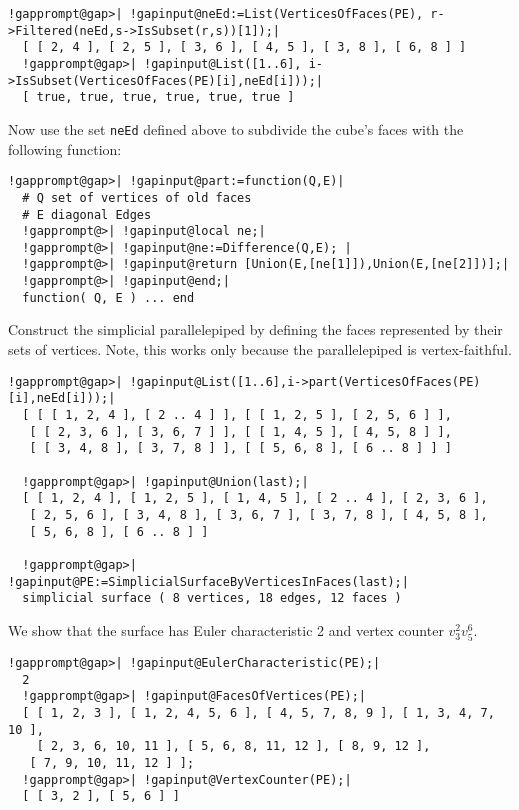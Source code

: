 \documentclass[a4paper,11pt]{report}
\begin{document}
{{{\begin{Verbatim}[commandchars=!@|,fontsize=\small,frame=single,label=Example]
  !gapprompt@gap>| !gapinput@neEd:=List(VerticesOfFaces(PE), r->Filtered(neEd,s->IsSubset(r,s))[1]);|
  [ [ 2, 4 ], [ 2, 5 ], [ 3, 6 ], [ 4, 5 ], [ 3, 8 ], [ 6, 8 ] ]
  !gapprompt@gap>| !gapinput@List([1..6], i->IsSubset(VerticesOfFaces(PE)[i],neEd[i]));|
  [ true, true, true, true, true, true ]
\end{Verbatim}
 

 
\begin{center}

\end{center}
 Now use the set \texttt{neEd} defined above to subdivide the cube's faces with the following function: 

 
\begin{Verbatim}[commandchars=!@|,fontsize=\small,frame=single,label=Example]
  !gapprompt@gap>| !gapinput@part:=function(Q,E)|
  # Q set of vertices of old faces 
  # E diagonal Edges
  !gapprompt@>| !gapinput@local ne;|
  !gapprompt@>| !gapinput@ne:=Difference(Q,E); |
  !gapprompt@>| !gapinput@return [Union(E,[ne[1]]),Union(E,[ne[2]])];|
  !gapprompt@>| !gapinput@end;|
  function( Q, E ) ... end
\end{Verbatim}
 

 Construct the simplicial parallelepiped by defining the faces represented by
their sets of vertices. Note, this works only because the parallelepiped is
vertex-faithful. 

 
\begin{Verbatim}[commandchars=!@|,fontsize=\small,frame=single,label=Example]
  !gapprompt@gap>| !gapinput@List([1..6],i->part(VerticesOfFaces(PE)[i],neEd[i]));|
  [ [ [ 1, 2, 4 ], [ 2 .. 4 ] ], [ [ 1, 2, 5 ], [ 2, 5, 6 ] ],
   [ [ 2, 3, 6 ], [ 3, 6, 7 ] ], [ [ 1, 4, 5 ], [ 4, 5, 8 ] ], 
   [ [ 3, 4, 8 ], [ 3, 7, 8 ] ], [ [ 5, 6, 8 ], [ 6 .. 8 ] ] ]
  
  !gapprompt@gap>| !gapinput@Union(last);|
  [ [ 1, 2, 4 ], [ 1, 2, 5 ], [ 1, 4, 5 ], [ 2 .. 4 ], [ 2, 3, 6 ],
   [ 2, 5, 6 ], [ 3, 4, 8 ], [ 3, 6, 7 ], [ 3, 7, 8 ], [ 4, 5, 8 ], 
   [ 5, 6, 8 ], [ 6 .. 8 ] ]
  
  !gapprompt@gap>| !gapinput@PE:=SimplicialSurfaceByVerticesInFaces(last);|
  simplicial surface ( 8 vertices, 18 edges, 12 faces )
\end{Verbatim}
 

 We show that the surface has Euler characteristic 2 and vertex counter $v_3^2 v_5^6$. 

 
\begin{Verbatim}[commandchars=!@|,fontsize=\small,frame=single,label=Example]
  !gapprompt@gap>| !gapinput@EulerCharacteristic(PE);|
  2
  !gapprompt@gap>| !gapinput@FacesOfVertices(PE);|
  [ [ 1, 2, 3 ], [ 1, 2, 4, 5, 6 ], [ 4, 5, 7, 8, 9 ], [ 1, 3, 4, 7, 10 ],
    [ 2, 3, 6, 10, 11 ], [ 5, 6, 8, 11, 12 ], [ 8, 9, 12 ],
   [ 7, 9, 10, 11, 12 ] ];
  !gapprompt@gap>| !gapinput@VertexCounter(PE);|
  [ [ 3, 2 ], [ 5, 6 ] ]
\end{Verbatim}
 

}}}
\end{document}
